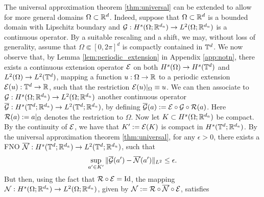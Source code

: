 \documentclass[reqno,a4paper]{amsart}
\newcommand{\rev}[1]{{\color{blue} #1}}
\begin{document}
\iffalse
\begin{remark}
\label{rem:extend}
The universal approximation theorem \ref{thm:universal} can be extended to allow for more general domains $\Omega \subset \mathbb{R}^d$. Indeed, suppose that $\Omega \subset \mathbb{R}^d$ is a bounded domain \rev{with Lipschitz boundary} and $\mathcal{G}: H^s(\Omega; \mathbb{R}^{d_a})\to L^2(\Omega;\mathbb{R}^{d_u})$ is a continuous operator. By a suitable rescaling and a shift, we may, without loss of generality, assume that $\Omega \Subset [0,2\pi]^d$ is compactly contained in $\mathbb{T}^d$. We now observe that, \rev{by Lemma \ref{lem:periodic_extension} in Appendix \ref{app:notn}, there} 
exists a continuous extension operator $\mathcal{E}$ on both $H^s(\Omega)\to H^s(\mathbb{T}^d)$ and $L^2(\Omega)\to L^2(\mathbb{T}^d)$, mapping a function $u: \Omega \to \mathbb{R}$ to a periodic extension $\mathcal{E}(u): \mathbb{T}^d \to \mathbb{R}$, such that the restriction $\mathcal{E}(u)|_{\Omega} \equiv u$. \rev{We can then} associate to $\mathcal{G}: H^s(\Omega; \mathbb{R}^{d_a}) \to L^2(\Omega;\mathbb{R}^{d_u})$ another continuous operator $\overline{\mathcal{G}}: H^s(\mathbb{T}^d; \mathbb{R}^{d_a}) \to L^2(\mathbb{T}^d;\mathbb{R}^{d_u})$, by defining $\overline{\mathcal{G}}(a) := \mathcal{E} \circ \mathcal{G} \circ \mathcal{R}(a)$. Here $\mathcal{R}(a) := a|_{\Omega}$ denotes the restriction to $\Omega$. Now let $K \subset H^s(\Omega;\mathbb{R}^{d_a})$ be compact.
 By the continuity of $\mathcal{E}$, we have that $K' := \mathcal{E}(K)$ is compact in $H^s(\mathbb{T}^d;\mathbb{R}^{d_a})$. By the universal approximation theorem \ref{thm:universal}, for any $\epsilon > 0$, there exists a FNO $\overline{\mathcal{N}}: H^s(\mathbb{T}^d; \mathbb{R}^{d_a}) \to L^2(\mathbb{T}^d;\mathbb{R}^{d_u})$, such that 
\[
\sup_{a'\in K'} \Vert \overline{\mathcal{G}}(a') - \overline{\mathcal{N}}(a') \Vert_{L^2} \le \epsilon.
\]
But then, using the fact that $\mathcal{R} \circ \mathcal{E} = \mathrm{Id}$, the mapping $\mathcal{N}: H^s(\Omega;\mathbb{R}^{d_a}) \to L^2(\Omega;\mathbb{R}^{d_u})$, 
given by $\mathcal{N} := \mathcal{R} \circ \overline{\mathcal{N}} \circ \mathcal{E}$, satisfies

\end{remark}
\end{document}
